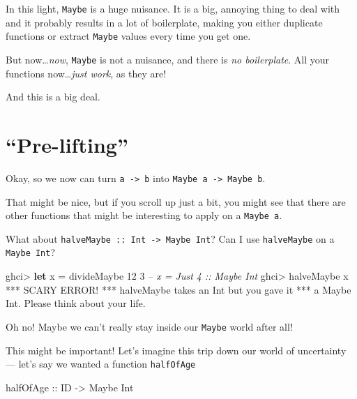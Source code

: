 \documentclass[]{article}
\newenvironment{Shaded}{}{}
\newcommand{\KeywordTok}[1]{\textcolor[rgb]{0.00,0.44,0.13}{\textbf{{#1}}}}
\newcommand{\DataTypeTok}[1]{\textcolor[rgb]{0.56,0.13,0.00}{{#1}}}
\newcommand{\DecValTok}[1]{\textcolor[rgb]{0.25,0.63,0.44}{{#1}}}
\newcommand{\CommentTok}[1]{\textcolor[rgb]{0.38,0.63,0.69}{\textit{{#1}}}}
\newcommand{\OtherTok}[1]{\textcolor[rgb]{0.00,0.44,0.13}{{#1}}}
\newcommand{\FunctionTok}[1]{\textcolor[rgb]{0.02,0.16,0.49}{{#1}}}
\newcommand{\NormalTok}[1]{{#1}}
\begin{document}
In this light, \texttt{Maybe} is a huge nuisance. It is a big, annoying
thing to deal with and it probably results in a lot of boilerplate,
making you either duplicate functions or extract \texttt{Maybe} values
every time you get one.

But now\ldots{}\emph{now}, \texttt{Maybe} is not a nuisance, and there
is \emph{no boilerplate}. All your functions now\ldots{}\emph{just
work}, as they are!

And this is a big deal.

\section{\texorpdfstring{``Pre-lifting''}{Pre-lifting}}\label{pre-lifting}

Okay, so we now can turn \texttt{a\ -\textgreater{}\ b} into
\texttt{Maybe\ a\ -\textgreater{}\ Maybe\ b}.

That might be nice, but if you scroll up just a bit, you might see that
there are other functions that might be interesting to apply on a
\texttt{Maybe\ a}.

What about \texttt{halveMaybe\ ::\ Int\ -\textgreater{}\ Maybe\ Int}?
Can I use \texttt{halveMaybe} on a \texttt{Maybe\ Int}?

\begin{Shaded}
\begin{Highlighting}[]
\NormalTok{ghci}\FunctionTok{>} \KeywordTok{let} \NormalTok{x }\FunctionTok{=} \NormalTok{divideMaybe }\DecValTok{12} \DecValTok{3}     \CommentTok{-- x = Just 4 :: Maybe Int}
\NormalTok{ghci}\FunctionTok{>} \NormalTok{halveMaybe x}
\FunctionTok{***} \DataTypeTok{SCARY} \DataTypeTok{ERROR}\FunctionTok{!}
\FunctionTok{***} \NormalTok{halveMaybe takes an }\DataTypeTok{Int} \NormalTok{but you gave it}
\FunctionTok{***} \NormalTok{a }\DataTypeTok{Maybe} \DataTypeTok{Int}\FunctionTok{.}  \DataTypeTok{Please} \NormalTok{think about your life}\FunctionTok{.}
\end{Highlighting}
\end{Shaded}

Oh no! Maybe we can't really stay inside our \texttt{Maybe} world after
all!

This might be important! Let's imagine this trip down our world of
uncertainty --- let's say we wanted a function \texttt{halfOfAge}

\begin{Shaded}
\begin{Highlighting}[]
\OtherTok{halfOfAge ::} \DataTypeTok{ID} \OtherTok{->} \DataTypeTok{Maybe} \DataTypeTok{Int}
\end{Highlighting}
\end{Shaded}
\end{document}
